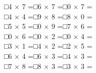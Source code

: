 \documentclass[uplatex,
paper=a4,
fontsize=18pt,
jafontsize=16pt,
number_of_lines=30,
line_length=30zh,
baselineskip=25pt,
]{jlreq}
\begin{document}
□\hspace{1em}4 × 7 =\hspace{3em}□\hspace{1em}6 × 7 =\hspace{3em}□\hspace{1em}0 × 7 =\hspace{3em}
\\

□\hspace{1em}4 × 4 =\hspace{3em}□\hspace{1em}9 × 8 =\hspace{3em}□\hspace{1em}8 × 0 =\hspace{3em}
\\

□\hspace{1em}5 × 5 =\hspace{3em}□\hspace{1em}0 × 9 =\hspace{3em}□\hspace{1em}7 × 6 =\hspace{3em}
\\

□\hspace{1em}0 × 6 =\hspace{3em}□\hspace{1em}0 × 2 =\hspace{3em}□\hspace{1em}0 × 4 =\hspace{3em}
\\

□\hspace{1em}3 × 1 =\hspace{3em}□\hspace{1em}4 × 2 =\hspace{3em}□\hspace{1em}2 × 5 =\hspace{3em}
\\

□\hspace{1em}6 × 4 =\hspace{3em}□\hspace{1em}6 × 3 =\hspace{3em}□\hspace{1em}4 × 3 =\hspace{3em}
\\

□\hspace{1em}7 × 8 =\hspace{3em}□\hspace{1em}8 × 3 =\hspace{3em}□\hspace{1em}3 × 3 =\hspace{3em}
\\
\end{document}
